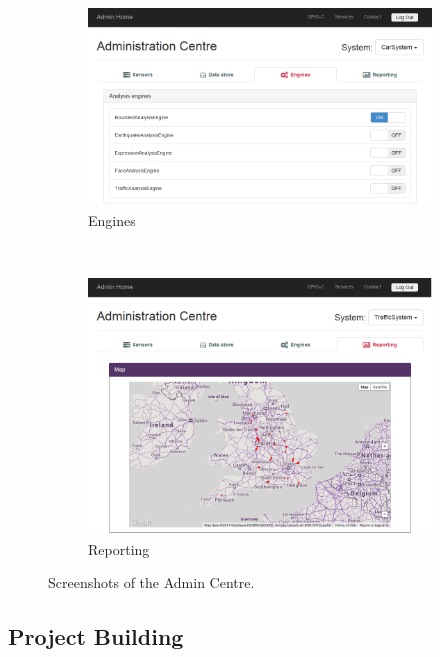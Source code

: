 \documentclass[10pt,a4paper]{article}
\begin{document}
\begin{figure}[h!b]
    \begin{subfigure}{0.49\textwidth}
        \includegraphics[width=\textwidth]{images/admin-centre_engines.png}
		\vspace*{0.95cm}
        \caption{Engines}
        \label{fig:admin-centre_engines}
    \end{subfigure}
	~
	\begin{subfigure}{0.49\textwidth}
        \includegraphics[width=\textwidth]{images/admin-centre_report.png}
        \caption{Reporting}
        \label{fig:admin-centre_report}
    \end{subfigure}
    \caption{Screenshots of the Admin Centre.}
	\label{fig:admin-centre}
\end{figure}

\subsection{Project Building}
\end{document}

